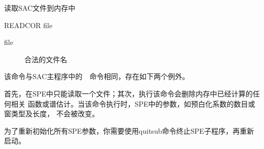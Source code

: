 \label{spe:readcor}

读取SAC文件到内存中

\begin{SACSTX}
READCOR file
\end{SACSTX}

\begin{description}
\item [file] 合法的文件名
\end{description}

该命令与SAC主程序中的~~命令相同，存在如下两个例外。

首先，在SPE中只能读取一个文件；其次，执行该命令会删除内存中已经计算的任何相关
函数或谱估计。当该命令执行时，SPE中的参数，如预白化系数的数目或窗类型及长度，
不会被改变。

为了重新初始化所有SPE参数，你需要使用quitsub命令终止SPE子程序，再重新启动。
